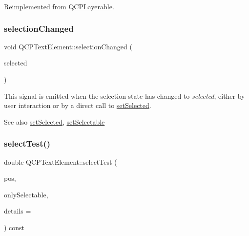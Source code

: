 Reimplemented from \hyperlink{class_q_c_p_layerable_aa0d79b005686f668622bbe66ac03ba2c}{Q\+C\+P\+Layerable}.

\mbox{\label{class_q_c_p_text_element_a49f45b87ee9c1fe866c2cdd12af17a9a}} 
\subsubsection{\texorpdfstring{selection\+Changed}{selectionChanged}}
{\footnotesize\ttfamily void Q\+C\+P\+Text\+Element\+::selection\+Changed (\begin{DoxyParamCaption}\item[{bool}]{selected }\end{DoxyParamCaption})\hspace{0.3cm}{\ttfamily [signal]}}

This signal is emitted when the selection state has changed to {\itshape selected}, either by user interaction or by a direct call to \hyperlink{class_q_c_p_text_element_aba5521f9fb22a5f3d2f09ab37d4a1751}{set\+Selected}.

\begin{DoxySeeAlso}{See also}
\hyperlink{class_q_c_p_text_element_aba5521f9fb22a5f3d2f09ab37d4a1751}{set\+Selected}, \hyperlink{class_q_c_p_text_element_a3c5f9b1897a036b16495ed3fb8371c55}{set\+Selectable} 
\end{DoxySeeAlso}
\mbox{\label{class_q_c_p_text_element_a1e721bc2994a127ef5a8f0a514a5dbac}} 
\subsubsection{\texorpdfstring{select\+Test()}{selectTest()}\hspace{0.1cm}{\footnotesize\ttfamily [1/2]}}
{\footnotesize\ttfamily double Q\+C\+P\+Text\+Element\+::select\+Test (\begin{DoxyParamCaption}\item[{const Q\+PointF \&}]{pos,  }\item[{bool}]{only\+Selectable,  }\item[{Q\+Variant $\ast$}]{details = {} }\end{DoxyParamCaption}) const\hspace{0.3cm}{\ttfamily [virtual]}}

